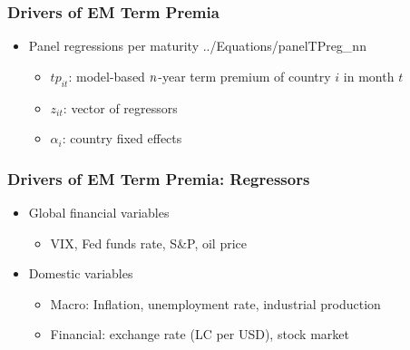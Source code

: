 \documentclass[12pt, aspectratio=169, xcolor=dvipsnames]{beamer} 			         %
\begin{document}
\begin{frame}[label=corr_10yr]
	
	
\end{frame}

\begin{frame}
	\frametitle{Drivers of EM Term Premia}
	\begin{itemize}
		\item Panel regressions per maturity
		 {../Equations/panelTPreg_nn}
		\vspace{-0.5cm}
		\begin{itemize}
			\item $tp_{it}$: model-based $n$-year term premium of country $i$ in month $t$
			\item $z_{it}$: vector of regressors
			\item $\alpha_{i}$: country fixed effects
		\end{itemize}
	\end{itemize}
\end{frame}

\begin{frame}
\frametitle{Drivers of EM Term Premia: Regressors}
\begin{itemize}
	\item Global financial variables
	\begin{itemize}
		\item VIX, Fed funds rate, S\&P, oil price
	\end{itemize}
	\item Domestic variables
	\begin{itemize}
		\item Macro: Inflation, unemployment rate, industrial production
		\item Financial: exchange rate (LC per USD), stock market
	\end{itemize}
\end{itemize}
\end{frame}
\end{document}
